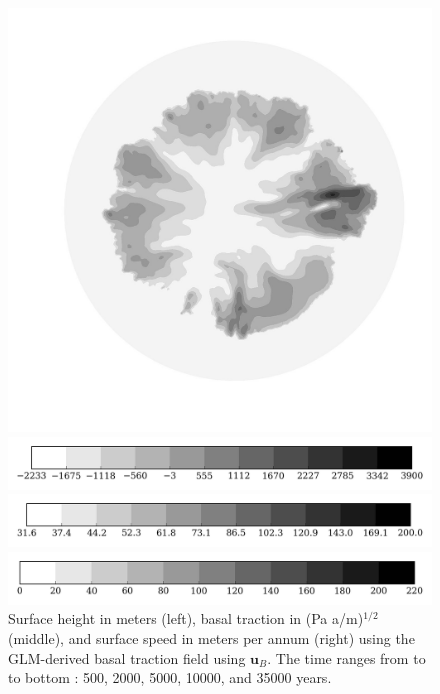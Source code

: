 \begin{figure}
\begin{minipage}[b]{0.30\linewidth}
  \end{minipage}
  \quad
  \begin{minipage}[b]{0.30\linewidth}
    \includegraphics[width=1.0\textwidth]{images/EISMINT_II/U/U_mag_35000.jpg}
  \end{minipage}
  
  \begin{minipage}[b]{0.30\linewidth}
    \includegraphics[width=1.0\textwidth]{images/EISMINT_II/U/S_cb.jpg}
  \end{minipage}
  \quad
  \begin{minipage}[b]{0.30\linewidth}
    \includegraphics[width=1.0\textwidth]{images/EISMINT_II/U/beta_cb.jpg}
  \end{minipage}
  \quad
  \begin{minipage}[b]{0.30\linewidth}
    \includegraphics[width=1.0\textwidth]{images/EISMINT_II/U/U_mag_cb.jpg}
  \end{minipage}
  \caption[]{Surface height in meters (left), basal traction in (Pa a/m)$^{1/2}$ (middle), and surface speed in meters per annum (right) using the GLM-derived basal traction field using $\mathbf{u}_B$.  The time ranges from to to bottom : 500, 2000, 5000, 10000, and 35000 years.}
\end{figure}


